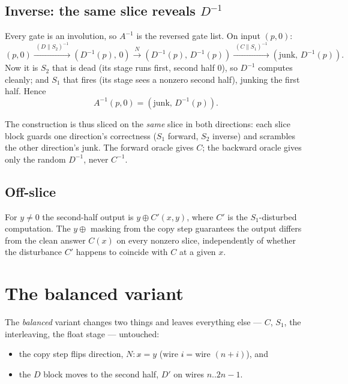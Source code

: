 \documentclass[11pt]{article}
\begin{document}
\subsection{Inverse: the same slice reveals $D^{-1}$}

Every gate is an involution, so $A^{-1}$ is the reversed gate list. On input
$(p,0)$:
\[
(p,0)
\xrightarrow{\;(D \parallel S_2)^{-1}\;} (D^{-1}(p),\,0)
\xrightarrow{\;N\;} (D^{-1}(p),\,D^{-1}(p))
\xrightarrow{\;(C \parallel S_1)^{-1}\;} (\text{junk},\,D^{-1}(p)).
\]
Now it is $S_2$ that is dead (its stage runs first, second half $0$), so
$D^{-1}$ computes cleanly; and $S_1$ that fires (its stage sees a nonzero
second half), junking the first half. Hence
\[
\boxed{\,A^{-1}(p,0) = (\text{junk},\, D^{-1}(p)).\,}
\]

The construction is thus sliced on the \emph{same} slice in both directions:
each slice block guards one direction's correctness ($S_1$ forward, $S_2$
inverse) and scrambles the other direction's junk. The forward oracle gives
$C$; the backward oracle gives only the random $D^{-1}$, never $C^{-1}$.

\subsection{Off-slice}

For $y \neq 0$ the second-half output is $y \oplus C'(x,y)$, where $C'$ is the
$S_1$-disturbed computation. The $y\oplus$ masking from the copy step
guarantees the output differs from the clean answer $C(x)$ on every nonzero
slice, independently of whether the disturbance $C'$ happens to coincide with
$C$ at a given $x$.

\section{The balanced variant}
\label{sec:balanced}

The \emph{balanced} variant changes two things and leaves everything else ---
$C$, $S_1$, the interleaving, the float stage --- untouched:

\begin{itemize}
\item the copy step flips direction, $N: x \mathrel{\hat{}}= y$
      (\;$\text{wire } i \mathrel{\hat{}}= \text{wire } (n{+}i)$\;), and
\item the $D$ block moves to the second half, $D'$ on wires $n..2n{-}1$.
\end{itemize}
\end{document}
